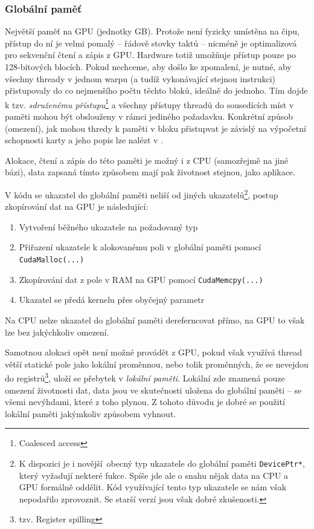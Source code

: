     \subsubsection{Globální paměť}

    Největší paměť na GPU (jednotky GB). Protože není fyzicky umístěna na čipu, přístup do ní je velmi pomalý -- řádově stovky taktů -- nicméně je optimalizová pro sekvenční čtení a zápis z GPU. Hardware totiž umožňuje přístup pouze po 128-bitových blocích. Pokud nechceme, aby došlo ke zpomalení, je nutné, aby všechny thready v jednom warpu (a tudíž vykonávající stejnou instrukci) přistupovaly do co nejmenšího počtu těchto bloků, ideálně do jednoho. Tím dojde k tzv. \emph{sdruženému přístupu}\footnote{Coalesced access} a všechny přístupy threadů do sousedících míst v paměti mohou být obslouženy v rámci jediného požadavku. Konkrétní způsob (omezení), jak mohou thredy k paměti v bloku přistupvat je závislý na výpočetní schopnosti karty a jeho popis lze nalézt v \cite{CUDA programming g.}.

    Alokace, čtení a zápis do této paměti je možný i z CPU (samozřejmě na jiné bázi), data zapsaná tímto způsobem mají pak životnost stejnou, jako aplikace.

    V kódu se ukazatel do globální paměti neliší od jiných ukazatelů\footnote{K dispozici je i \bq novější\eq ~obecný typ ukazatele do globální paměti {\tt DevicePtr*}, který vyžadují nekteré fukce. Spíše jde ale o snahu nějak data na CPU a GPU formálně oddělit. Kód využívající tento typ ukazatele se nám však nepodařilo zprovoznit. Se starší verzí jsou však dobré zkušenosti.}, postup zkopírování dat na GPU je následující:
    \begin{enumerate}
      \item Vytvoření běžného ukazatele na požadovaný typ
      \item Přiřazení ukazatele k alokovanému poli v globální paměti pomocí {\tt CudaMalloc(...)}
      \item Zkopírování dat z pole v RAM na GPU pomocí {\tt CudaMemcpy(...)}
      \item Ukazatel se předá kernelu přes obyčejný parametr
    \end{enumerate}
    Na CPU nelze ukazatel do globální paměti dereferncovat přímo, na GPU to však lze bez jakýchkoliv omezení.

    Samotnou alokaci opět není možné provádět z GPU, pokud však využívá thread větší statické pole jako lokální proměnnou, nebo tolik proměnných, že se nevejdou do registrů\footnote{tzv. Register spilling}, uloží se přebytek v \emph{lokální paměti}. Lokální zde znamená pouze omezení životnosti dat, data jsou ve skutečnosti uložena do globální paměti -- se všemi nevýhdami, které z toho plynou. Z tohoto důvodu je dobré se použití lokální paměti jakýmkoliv způsobem vyhnout.

